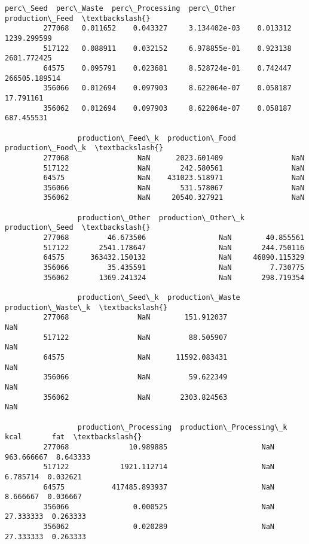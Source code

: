 \documentclass[11pt]{article}
\begin{document}
\begin{Verbatim}[commandchars=\\\{\}]
                 perc\_Seed  perc\_Waste  perc\_Processing  perc\_Other  production\_Feed  \textbackslash{}
         277068   0.011652    0.043327     3.134402e-03    0.013312      1239.299599   
         517122   0.088911    0.032152     6.978855e-01    0.923138      2601.772425   
         64575    0.095791    0.023681     8.528724e-01    0.742447    266505.189514   
         356066   0.012694    0.097903     8.622064e-07    0.058187        17.791161   
         356062   0.012694    0.097903     8.622064e-07    0.058187       687.455531   
         
                 production\_Feed\_k  production\_Food  production\_Food\_k  \textbackslash{}
         277068                NaN      2023.601409                NaN   
         517122                NaN       242.580561                NaN   
         64575                 NaN    431023.518971                NaN   
         356066                NaN       531.578067                NaN   
         356062                NaN     20540.327921                NaN   
         
                 production\_Other  production\_Other\_k  production\_Seed  \textbackslash{}
         277068         46.673506                 NaN        40.855561   
         517122       2541.178647                 NaN       244.750116   
         64575      363432.150132                 NaN     46890.115329   
         356066         35.435591                 NaN         7.730775   
         356062       1369.241324                 NaN       298.719354   
         
                 production\_Seed\_k  production\_Waste  production\_Waste\_k  \textbackslash{}
         277068                NaN        151.912037                 NaN   
         517122                NaN         88.505907                 NaN   
         64575                 NaN      11592.083431                 NaN   
         356066                NaN         59.622349                 NaN   
         356062                NaN       2303.824563                 NaN   
         
                 production\_Processing  production\_Processing\_k        kcal       fat  \textbackslash{}
         277068              10.989885                      NaN  963.666667  8.643333   
         517122            1921.112714                      NaN    6.785714  0.032621   
         64575           417485.893937                      NaN    8.666667  0.036667   
         356066               0.000525                      NaN   27.333333  0.263333   
         356062               0.020289                      NaN   27.333333  0.263333   
         

\end{Verbatim}
\end{document}

